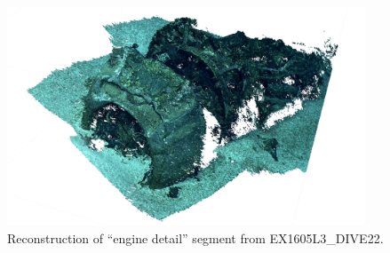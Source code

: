 \documentclass[letterpaper,12pt]{article}
\begin{document}
\begin{figure}
    \centering
    \includegraphics[width=0.95\textwidth]{images/engine_detail_photoscan.png}
    \caption{Reconstruction of ``engine detail'' segment from EX1605L3\_DIVE22.}
    \label{fig:ex1605l3_dive22_engine_detail_photoscan}
\end{figure}
\end{document}

